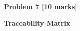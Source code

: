 \documentclass[12pt]{article}
\begin{document}
\vspace{\baselineskip}

\vspace{\baselineskip}

\vspace{\baselineskip}

\vspace{\baselineskip}

\vspace{\baselineskip}

\vspace{\baselineskip}

\vspace{\baselineskip}

\vspace{\baselineskip}

\vspace{\baselineskip}

\vspace{\baselineskip}

\vspace{\baselineskip}
{\fontsize{13pt}{15.6pt}\selectfont \textbf{Problem 7 [10 marks]}\par}\par

{\fontsize{13pt}{15.6pt}\selectfont \textbf{Traceability Matrix}\par}\par


\vspace{\baselineskip}


\end{document}
